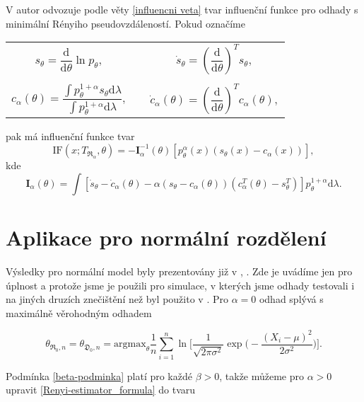 V \cite{Vajda2009} autor odvozuje podle věty \ref{influencni veta} tvar influenční funkce pro odhady s minimální Rényiho pseudovzdáleností. Pokud označíme 
\begin{center}
	\begin{tabular}{c c}
	$s_\theta = \dfrac{\mathrm{d}}{\mathrm{d}\theta} \ln p_\theta, \quad$ & $ \dot{s}_\theta = \left( \dfrac{\mathrm{d}}{\mathrm{d}\theta} \right)^T s_\theta,$ \\ 
	&\\
	$c_\alpha(\theta) = \dfrac{\int p_\theta^{1+\alpha}s_\theta \mathrm{d}\lambda}{\int p_\theta^{1+\alpha} \mathrm{d}\lambda}, \quad$ & $\dot{c}_\alpha(\theta)= \left( \dfrac{\mathrm{d}}{\mathrm{d}\theta} \right)^T c_\alpha(\theta),$  \\ 
	\end{tabular} 
\end{center}
pak má influenční funkce tvar 
\begin{equation}
	\mathrm{IF}(x;T_{\mathfrak{R}_\alpha},\theta) = -\mathbf{I}^{-1}_{\alpha}(\theta) \left[ p_\theta^\alpha(x) (s_\theta (x) - c_\alpha (x)) \right], 
	\label{IF}
\end{equation}
kde 
\begin{equation}
\mathbf{I}_{\alpha}(\theta) = \int{ \left[\dot{s}_\theta - \dot{c}_\alpha(\theta) - \alpha(s_\theta - c_\alpha(\theta))(c^T_\alpha(\theta) - s^T_\theta) \right] p_\theta^{1+\alpha} \mathrm{d}\lambda}.
\end{equation}

\section{Aplikace pro normální rozdělení}

Výsledky pro normální model byly prezentovány již v \cite{Vajda2009}, \cite{Demut2010}. Zde je uvádíme jen pro úplnost a protože jsme je použili pro simulace, v kterých jsme odhady testovali i na jiných druzích znečištění než byl použito v \cite{Demut2010}.
Pro $\alpha = 0$ odhad splývá s maximálně věrohodným odhadem

\begin{equation}
\theta_{\mathfrak{R}_0,n} = \theta_{\mathfrak{D}_0,n} = \text{argmax}_{\theta} \frac{1}{n}\sum_{i=1}^n \ln \biggl[\frac{1}{\sqrt{2\pi \sigma^2}} \exp\biggl(-\frac{(X_i-\mu)^2}{2\sigma^2}\biggr)\biggr].
\end{equation}

\noindent Podmínka \eqref{beta-podminka} platí pro každé $\beta > 0$, takže můžeme pro $\alpha>0$ upravit {\mRao} \eqref{Renyi-estimator_formula} do tvaru

